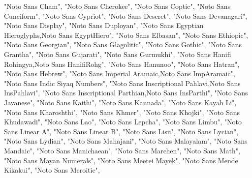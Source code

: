 \documentclass[
]{article}
\newenvironment{Shaded}{\begin{snugshade}}{\end{snugshade}}
\newcommand{\NormalTok}[1]{#1}
\newcommand{\StringTok}[1]{\textcolor[rgb]{0.31,0.60,0.02}{#1}}
\begin{document}
\begin{Shaded}
\begin{Highlighting}[]
  \StringTok{"Noto Sans Cham"}\NormalTok{,}
  \StringTok{"Noto Sans Cherokee"}\NormalTok{,}
  \StringTok{"Noto Sans Coptic"}\NormalTok{,}
  \StringTok{"Noto Sans Cuneiform"}\NormalTok{,}
  \StringTok{"Noto Sans Cypriot"}\NormalTok{,}
  \StringTok{"Noto Sans Deseret"}\NormalTok{,}
  \StringTok{"Noto Sans Devanagari"}\NormalTok{,}
  \StringTok{"Noto Sans Display"}\NormalTok{,}
  \StringTok{"Noto Sans Duployan"}\NormalTok{,}
  \StringTok{"Noto Sans Egyptian Hieroglyphs,Noto Sans EgyptHiero"}\NormalTok{,}
  \StringTok{"Noto Sans Elbasan"}\NormalTok{,}
  \StringTok{"Noto Sans Ethiopic"}\NormalTok{,}
  \StringTok{"Noto Sans Georgian"}\NormalTok{,}
  \StringTok{"Noto Sans Glagolitic"}\NormalTok{,}
  \StringTok{"Noto Sans Gothic"}\NormalTok{,}
  \StringTok{"Noto Sans Grantha"}\NormalTok{,}
  \StringTok{"Noto Sans Gujarati"}\NormalTok{,}
  \StringTok{"Noto Sans Gurmukhi"}\NormalTok{,}
  \StringTok{"Noto Sans Hanifi Rohingya,Noto Sans HanifiRohg"}\NormalTok{,}
  \StringTok{"Noto Sans Hanunoo"}\NormalTok{,}
  \StringTok{"Noto Sans Hatran"}\NormalTok{,}
  \StringTok{"Noto Sans Hebrew"}\NormalTok{,}
  \StringTok{"Noto Sans Imperial Aramaic,Noto Sans ImpAramaic"}\NormalTok{,}
  \StringTok{"Noto Sans Indic Siyaq Numbers"}\NormalTok{,}
  \StringTok{"Noto Sans Inscriptional Pahlavi,Noto Sans InsPahlavi"}\NormalTok{,}
  \StringTok{"Noto Sans Inscriptional Parthian,Noto Sans InsParthi"}\NormalTok{,}
  \StringTok{"Noto Sans Javanese"}\NormalTok{,}
  \StringTok{"Noto Sans Kaithi"}\NormalTok{,}
  \StringTok{"Noto Sans Kannada"}\NormalTok{,}
  \StringTok{"Noto Sans Kayah Li"}\NormalTok{,}
  \StringTok{"Noto Sans Kharoshthi"}\NormalTok{,}
  \StringTok{"Noto Sans Khmer"}\NormalTok{,}
  \StringTok{"Noto Sans Khojki"}\NormalTok{,}
  \StringTok{"Noto Sans Khudawadi"}\NormalTok{,}
  \StringTok{"Noto Sans Lao"}\NormalTok{,}
  \StringTok{"Noto Sans Lepcha"}\NormalTok{,}
  \StringTok{"Noto Sans Limbu"}\NormalTok{,}
  \StringTok{"Noto Sans Linear A"}\NormalTok{,}
  \StringTok{"Noto Sans Linear B"}\NormalTok{,}
  \StringTok{"Noto Sans Lisu"}\NormalTok{,}
  \StringTok{"Noto Sans Lycian"}\NormalTok{,}
  \StringTok{"Noto Sans Lydian"}\NormalTok{,}
  \StringTok{"Noto Sans Mahajani"}\NormalTok{,}
  \StringTok{"Noto Sans Malayalam"}\NormalTok{,}
  \StringTok{"Noto Sans Mandaic"}\NormalTok{,}
  \StringTok{"Noto Sans Manichaean"}\NormalTok{,}
  \StringTok{"Noto Sans Marchen"}\NormalTok{,}
  \StringTok{"Noto Sans Math"}\NormalTok{,}
  \StringTok{"Noto Sans Mayan Numerals"}\NormalTok{,}
  \StringTok{"Noto Sans Meetei Mayek"}\NormalTok{,}
  \StringTok{"Noto Sans Mende Kikakui"}\NormalTok{,}
  \StringTok{"Noto Sans Meroitic"}\NormalTok{,}

\end{Highlighting}
\end{Shaded}
\end{document}
